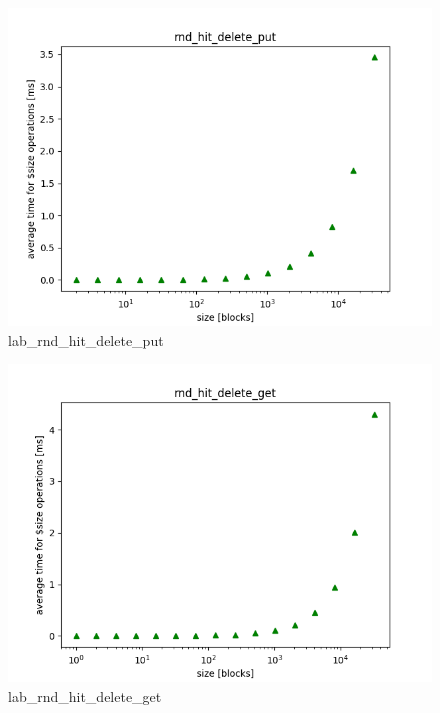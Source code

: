 \documentclass[twocolumn,11pt]{article}
\begin{document}
\begin{figure}[h!]
  \includegraphics[width=\linewidth]{Pictures/LABPC/rnd_hit_delete_complete_put.png}
  \caption{lab\_rnd\_hit\_delete\_put}
  \label{fig:lab_rnd_hit_delete_put}
\end{figure}
\begin{figure}[h!]
  \includegraphics[width=\linewidth]{Pictures/LABPC/rnd_hit_delete_complete_get.png}
  \caption{lab\_rnd\_hit\_delete\_get}
  \label{fig:lab_rnd_hit_delete_get}
\end{figure}
\end{document}
